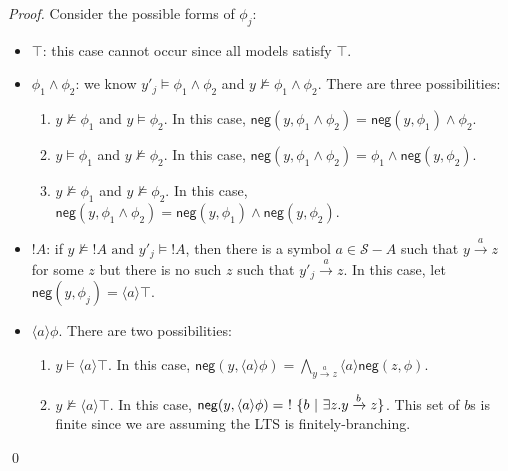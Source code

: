 \begin{proof}
Consider the possible forms of $\phi_j$:
\begin{itemize}
\item
$\top$: this case cannot occur since all models satisfy $\top$.
\item
$\phi_1 \land \phi_2$: we know $y'_j \models \phi_1 \land \phi_2$ and $y \nvDash \phi_1 \land \phi_2$. There are three possibilities:
\begin{enumerate}
\item
$y \nvDash \phi_1$ and $y \models \phi_2$. In this case, $\mathsf{neg}(y, \phi_1 \land \phi_2) = \mathsf{neg}(y, \phi_1) \land \phi_2$.
\item
$y \models \phi_1$ and $y \nvDash \phi_2$. In this case, $\mathsf{neg}(y, \phi_1 \land \phi_2) = \phi_1 \land \mathsf{neg}(y, \phi_2)$.
\item
$y \nvDash \phi_1$ and $y \nvDash \phi_2$. In this case, $\mathsf{neg}(y, \phi_1 \land \phi_2) =  \mathsf{neg}(y, \phi_1) \land \mathsf{neg}(y, \phi_2)$.
\end{enumerate}
\item
$!A$: if $y \nvDash !A \mbox{ and } y'_j \models !A$, then there is a symbol $a \in \mathcal{S}-A$ such that $y \xrightarrow{a} z$ for some $z$ but there is no such $z$ such that $y'_j \xrightarrow{a} z$. In this case, let $\mathsf{neg}(y, \phi_j) = \langle a \rangle \top$.
\item
$\langle a \rangle \phi$. There are two possibilities:
\begin{enumerate}
\item
$y \models \langle a \rangle \top$. In this case, $\mathsf{neg}(y, \langle a \rangle \phi) =  \bigwedge\limits_{y \xrightarrow{a} z}  \langle a \rangle \mathsf{neg}(z, \phi)$.
\item
$y \nvDash \langle a \rangle \top$. In this case, $\mathsf{neg}(y, \langle a \rangle \phi) = \ ! \  \{ b \ | \  \exists z. y \xrightarrow{b} z\}$. This set of $b$s is finite since we are assuming the LTS is finitely-branching.
\end{enumerate}
\end{itemize}
\qed
\end{proof}

